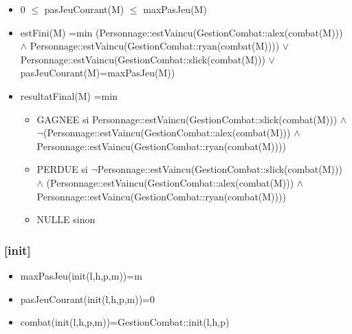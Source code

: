 \documentclass[11pt]{article}
\begin{document}
\begin{itemize}

\item 0 $\leqslant$ pasJeuCourant(M) $\leqslant$ maxPasJeu(M)\\
\label{sec-1.7.1.1}


\item estFini(M) =min (Personnage::estVaincu(GestionCombat::alex(combat(M))) $\wedge$ Personnage::estVaincu(GestionCombat::ryan(combat(M)))) $\vee$ Personnage::estVaincu(GestionCombat::slick(combat(M))) $\vee$ pasJeuCourant(M)=maxPasJeu(M))\\
\label{sec-1.7.1.2}


\item resultatFinal(M) =min\\
\label{sec-1.7.1.3}

\begin{itemize}

\item GAGNEE si Personnage::estVaincu(GestionCombat::slick(combat(M))) $\wedge$ $\neg$(Personnage::estVaincu(GestionCombat::alex(combat(M))) $\wedge$ Personnage::estVaincu(GestionCombat::ryan(combat(M))))\\
\label{sec-1.7.1.3.1}


\item PERDUE si $\neg$Personnage::estVaincu(GestionCombat::slick(combat(M))) $\wedge$ (Personnage::estVaincu(GestionCombat::alex(combat(M))) $\wedge$ Personnage::estVaincu(GestionCombat::ryan(combat(M))))\\
\label{sec-1.7.1.3.2}


\item NULLE sinon\\
\label{sec-1.7.1.3.3}


\end{itemize} %
\end{itemize} %
\subsubsection{[init]}
\label{sec-1.7.2}

\begin{itemize}

\item maxPasJeu(init(l,h,p,m))=m\\
\label{sec-1.7.2.1}


\item pasJeuCourant(init(l,h,p,m))=0\\
\label{sec-1.7.2.2}


\item combat(init(l,h,p,m))=GestionCombat::init(l,h,p)\\
\label{sec-1.7.2.3}


\end{itemize} %
\end{document}

